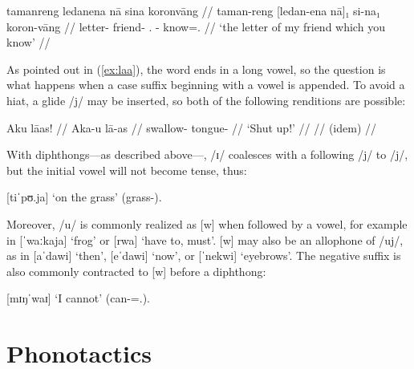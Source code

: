 \ex\begingl
	\gla tamanreng ledanena nā sina koronvāng //
	\glb taman-reng [ledan-ena nā]₁ si-na₁ koron-vāng //
	\glc letter-\AargI{} friend-\Gen{} \Fsg.\Gen{} \Rel{}-\Gen{} 
		know=\Ssg{}.\Aarg{} //
	\glft `the letter of my friend which you know' //
\endgl\xe

As pointed out in (\ref{ex:laa}), the word  ends in a 
long vowel, so the question is what happens when a case suffix beginning with a 
vowel is appended. To avoid a hiat, a glide /j/ may be inserted, so both of 
the following renditions are possible:

\pex
	\a\begingl
		\gla Aku lāas! //
		\glb Aka-u lā-as //
		\glc swallow-\Imp{} tongue-\Parg{} //
		\glft `Shut up!' //
	\endgl
	\a\begingl
		 //
		\glft (idem) //
	\endgl
\xe

\noindent With diphthongs---as described above---, /ɪ/ coalesces with a 
following /j/ to /j/, but the initial vowel will not become tense, thus:

\ex
	 [tiˈpʊ.ja] `on the grass' 
(grass-\Loc{}).
\xe

Moreover, /u/ is commonly realized as [w] when followed by a vowel, for example 
in  [ˈwaːkaja] `frog' or  [rwa] `have 
to, must'. [w] may also be an allophone of /uj/, as in  
[aˈdawi] `then',  [eˈdawi] `now', or  
[ˈnekwi] `eyebrows'. The negative suffix  is also commonly 
contracted to [w] before a diphthong:

\ex
	 [mɪŋˈwaɪ] `I 
cannot' (can-\Neg{}=\Fsg{}.\Top{}).
\xe

%
%

\section{Phonotactics}

